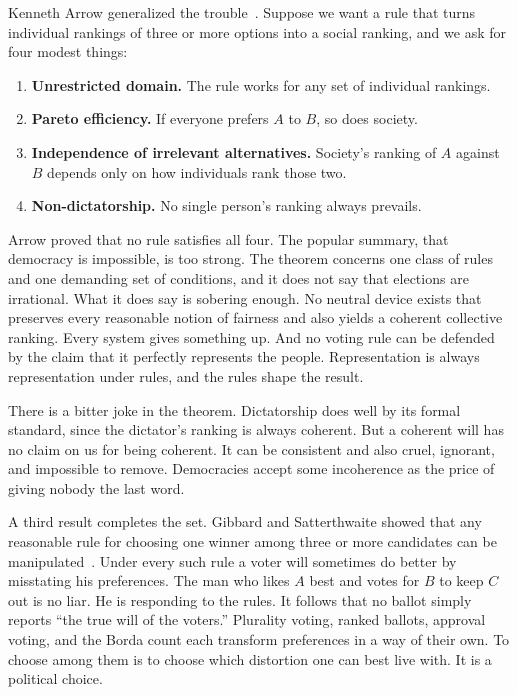 \documentclass[12pt,a4paper]{book}
\begin{document}
Kenneth Arrow generalized the trouble~\cite{Arrow1963}. Suppose we want a rule that turns individual rankings of three or more options into a social ranking, and we ask for four modest things:

\begin{enumerate}
\item \textbf{Unrestricted domain.} The rule works for any set of individual rankings.
\item \textbf{Pareto efficiency.} If everyone prefers $A$ to $B$, so does society.
\item \textbf{Independence of irrelevant alternatives.} Society's ranking of $A$ against $B$ depends only on how individuals rank those two.
\item \textbf{Non-dictatorship.} No single person's ranking always prevails.
\end{enumerate}

Arrow proved that no rule satisfies all four. The popular summary, that democracy is impossible, is too strong. The theorem concerns one class of rules and one demanding set of conditions, and it does not say that elections are irrational. What it does say is sobering enough. No neutral device exists that preserves every reasonable notion of fairness and also yields a coherent collective ranking. Every system gives something up. And no voting rule can be defended by the claim that it perfectly represents the people. Representation is always representation under rules, and the rules shape the result.

There is a bitter joke in the theorem. Dictatorship does well by its formal standard, since the dictator's ranking is always coherent. But a coherent will has no claim on us for being coherent. It can be consistent and also cruel, ignorant, and impossible to remove. Democracies accept some incoherence as the price of giving nobody the last word.

A third result completes the set. Gibbard and Satterthwaite showed that any reasonable rule for choosing one winner among three or more candidates can be manipulated~\cite{Gibbard1973,Satterthwaite1975}. Under every such rule a voter will sometimes do better by misstating his preferences. The man who likes $A$ best and votes for $B$ to keep $C$ out is no liar. He is responding to the rules. It follows that no ballot simply reports ``the true will of the voters.'' Plurality voting, ranked ballots, approval voting, and the Borda count each transform preferences in a way of their own. To choose among them is to choose which distortion one can best live with. It is a political choice.
\end{document}

